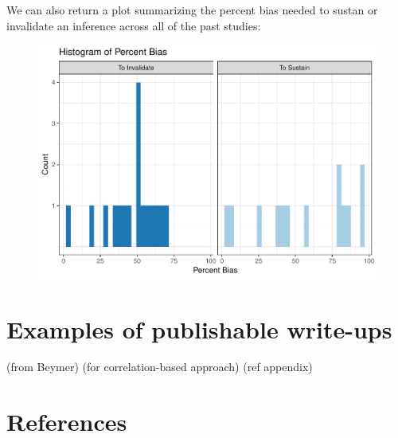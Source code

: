 \documentclass[man]{apa6}
\theoremstyle{definition}
\theoremstyle{definition}
\theoremstyle{definition}
\theoremstyle{remark}
\begin{document}
We can also return a plot summarizing the percent bias needed to sustan
or invalidate an inference across all of the past studies:

\begin{figure}
\centering
\includegraphics{papaja_files/figure-latex/unnamed-chunk-18-1.pdf}
\caption{}
\end{figure}

\section{Examples of publishable
write-ups}\label{examples-of-publishable-write-ups}

(from Beymer) (for correlation-based approach) (ref appendix)

\section{References}\label{references}

\setlength{\parindent}{-0.5in} \setlength{\leftskip}{0.5in}
\end{document}

